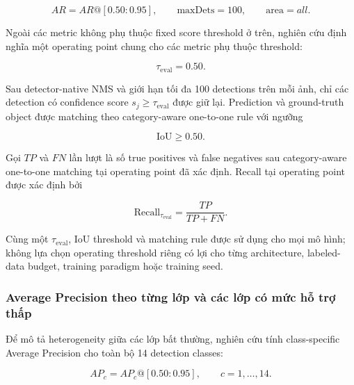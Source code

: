 \documentclass[pdflatex,sn-mathphys-num]{sn-jnl}%
\theoremstyle{thmstyleone}%
\theoremstyle{thmstyletwo}%
\theoremstyle{thmstylethree}%
\begin{document}
\begin{equation}
AR
=
AR@[0.50:0.95],
\qquad
\mathrm{maxDets}=100,
\qquad
\mathrm{area}=all.
\label{eq:coco_average_recall}
\end{equation}

Ngoài các metric không phụ thuộc fixed score threshold ở trên, nghiên cứu
định nghĩa một operating point chung cho các metric phụ thuộc threshold:

\begin{equation}
\tau_{\mathrm{eval}}=0.50.
\label{eq:evaluation_operating_threshold}
\end{equation}

Sau detector-native NMS và giới hạn tối đa 100 detections trên mỗi ảnh,
chỉ các detection có confidence score
\(s_j\geq\tau_{\mathrm{eval}}\) được giữ lại. Prediction và ground-truth
object được matching theo category-aware one-to-one rule với ngưỡng

\begin{equation}
\mathrm{IoU}\geq0.50.
\label{eq:operating_point_iou}
\end{equation}

Gọi \(TP\) và \(FN\) lần lượt là số true positives và false negatives
sau category-aware one-to-one matching tại operating point đã xác định.
Recall tại operating point được xác định bởi

\begin{equation}
\mathrm{Recall}_{\tau_{\mathrm{eval}}}
=
\frac{TP}{TP+FN}.
\label{eq:operating_point_recall}
\end{equation}

Cùng một \(\tau_{\mathrm{eval}}\), IoU threshold và matching rule được sử
dụng cho mọi mô hình; không lựa chọn operating threshold riêng có lợi cho
từng architecture, labeled-data budget, training paradigm hoặc training
seed.

\subsubsection{Average Precision theo từng lớp và các lớp có mức hỗ trợ thấp}
\label{subsubsec:classwise_rare_metrics}

Để mô tả heterogeneity giữa các lớp bất thường, nghiên cứu tính
class-specific Average Precision cho toàn bộ 14 detection classes:

\begin{equation}
AP_c
=
AP_c@[0.50:0.95],
\qquad
c=1,\ldots,14.
\label{eq:classwise_ap}
\end{equation}
\end{document}
